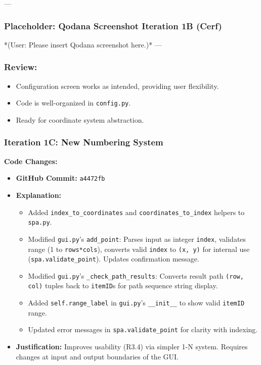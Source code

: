 --- %
\subsubsection*{Placeholder: Qodana Screenshot Iteration 1B (Cerf)}
*(User: Please insert Qodana screenshot here.)*
---

\subsubsection{Review:}
\begin{itemize}
	\item Configuration screen works as intended, providing user flexibility.
	\item Code is well-organized in \verb|config.py|.
	\item Ready for coordinate system abstraction.
\end{itemize}

\newpage

\subsubsection{Iteration 1C: New Numbering System}

\textbf{Code Changes:}
\begin{itemize}
	\item \textbf{GitHub Commit:} \verb|a4472fb|
	\item \textbf{Explanation:}
	\begin{itemize}
		\item Added \verb|index_to_coordinates| and \verb|coordinates_to_index| helpers to \verb|spa.py|.
		\item Modified \verb|gui.py|'s \verb|add_point|: Parses input as integer \verb|index|, validates range (1 to \verb|rows*cols|), converts valid \verb|index| to \verb|(x, y)| for internal use (\verb|spa.validate_point|). Updates confirmation message.
		\item Modified \verb|gui.py|'s \verb|_check_path_results|: Converts result path \verb|(row, col)| tuples back to \verb|itemID|s for path sequence string display.
		\item Added \verb|self.range_label| in \verb|gui.py|'s \verb|__init__| to show valid \verb|itemID| range.
		\item Updated error messages in \verb|spa.validate_point| for clarity with indexing.
	\end{itemize}
	\item \textbf{Justification:} Improves usability (R3.4) via simpler 1-N system. Requires changes at input and output boundaries of the GUI.
\end{itemize}

